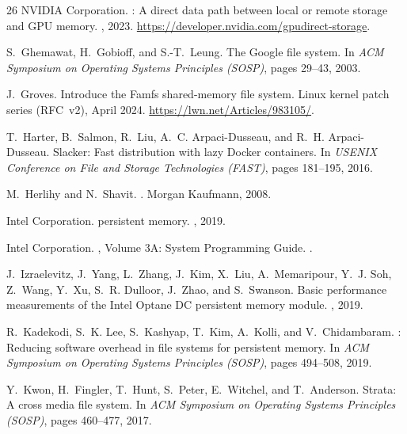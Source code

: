 \documentclass[letterpaper,twocolumn,10pt]{article}
\begin{document}
\begin{thebibliography}{26}
{NVIDIA Corporation}.
: A direct data path between local or remote
  storage and {GPU} memory.
, 2023.
\newblock \url{https://developer.nvidia.com/gpudirect-storage}.

S.~Ghemawat, H.~Gobioff, and S.-T.~Leung.
\newblock The {Google} file system.
\newblock In {\em ACM Symposium on Operating Systems Principles (SOSP)}, pages
  29--43, 2003.

J.~Groves.
\newblock Introduce the Famfs shared-memory file system.
\newblock Linux kernel patch series (RFC~v2), April 2024.
\newblock \url{https://lwn.net/Articles/983105/}.

T.~Harter, B.~Salmon, R.~Liu, A.~C. Arpaci-Dusseau, and R.~H.
  Arpaci-Dusseau.
\newblock Slacker: Fast distribution with lazy {Docker} containers.
\newblock In {\em USENIX Conference on File and Storage Technologies (FAST)},
  pages 181--195, 2016.

M.~Herlihy and N.~Shavit.
.
\newblock Morgan Kaufmann, 2008.

{Intel Corporation}.
 persistent memory.
, 2019.

{Intel Corporation}.
,
  Volume 3A: System Programming Guide.
.

J.~Izraelevitz, J.~Yang, L.~Zhang, J.~Kim, X.~Liu, A.~Memaripour, Y.~J. Soh,
  Z.~Wang, Y.~Xu, S.~R. Dulloor, J.~Zhao, and S.~Swanson.
\newblock Basic performance measurements of the {Intel Optane DC} persistent
  memory module.
, 2019.

R.~Kadekodi, S.~K. Lee, S.~Kashyap, T.~Kim, A.~Kolli, and V.~Chidambaram.
: Reducing software overhead in file systems for persistent
  memory.
\newblock In {\em ACM Symposium on Operating Systems Principles (SOSP)}, pages
  494--508, 2019.

Y.~Kwon, H.~Fingler, T.~Hunt, S.~Peter, E.~Witchel, and T.~Anderson.
\newblock Strata: A cross media file system.
\newblock In {\em ACM Symposium on Operating Systems Principles (SOSP)}, pages
  460--477, 2017.


\end{thebibliography}
\end{document}
